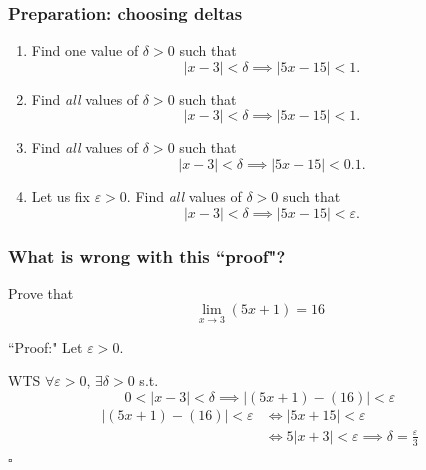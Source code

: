 \begin{frame}[t]
	\frametitle{Preparation: choosing deltas}

	\begin{enumerate}
		\item Find one value of $\delta >0$ such that
			\[
				|x-3|< \delta \implies |5x-15|<1.
			\]

		\item Find \emph{all} values of $\delta >0$ such that
			\[
				|x-3|< \delta \implies |5x-15|<1.
			\]

		\item Find \emph{all} values of $\delta >0$ such that
			\[
				|x-3|< \delta \implies |5x-15|<0.1.
			\]

		\item Let us fix $\varepsilon >0$. Find \emph{all} values of $\delta >0$ such
			that
			\[
				|x-3|< \delta \implies |5x-15|<\varepsilon.
			\]
	\end{enumerate}
\end{frame}

\begin{frame}
	\frametitle{What is wrong with this ``proof"?}
	\fontsize{13}{13}\selectfont
	\vspace{-2mm}
	\begin{block}{}%
		Prove that
		\[
			\lim_{x\to 3}(5x+1) = 16
		\]
	\end{block}

	\begin{block}{``Proof:"}
		Let $\varepsilon>0$.

		WTS $\forall \varepsilon>0$, $\exists\delta>0$ s.t.
		\[
			0<|x-3|<\delta \implies |(5x+1) - (16)|<\varepsilon
		\]
		\vspace{-3mm}
		\begin{align*}
			|(5x+1) - (16)|<\varepsilon & \iff |5x+15|<\varepsilon                                     \\
			                            & \iff 5|x+3|<\varepsilon \implies\delta=\frac{\varepsilon}{3}
		\end{align*}
		\hfill $\square$
	\end{block}
\end{frame}

